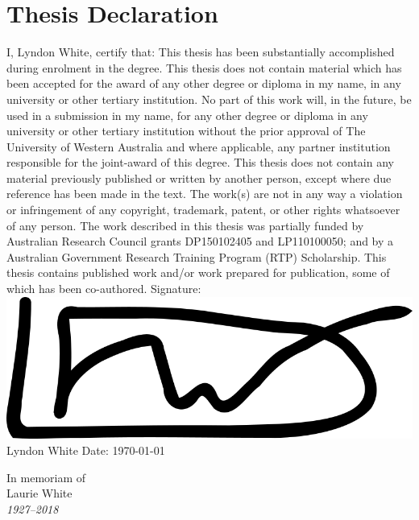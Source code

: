 \documentclass{book}
\begin{document}
\section*{Thesis Declaration}
\vskip 0.8cm
\begin{flushleft}
	I, Lyndon White, certify that:
	\vskip 0.5cm 
	This thesis has been substantially accomplished during enrolment in the degree.
	\vskip 0.25cm
	This thesis does not contain material which has been accepted for the award of any other degree or diploma in my name, in any university or other tertiary institution.
	\vskip 0.25cm
	No part of this work will, in the future, be used in a submission in my name, for any other degree or diploma in any university or other tertiary institution without the prior approval of The University of Western Australia and where applicable, any partner institution responsible for the joint-award of this degree.
	\vskip 0.25cm
	This thesis does not contain any material previously published or written by another person, except where due reference has been made in the text. 
	\vskip 0.25cm
	The work(s) are not in any way a violation or infringement of any copyright, trademark, patent, or other rights whatsoever of any person.
	\vskip 0.25cm
	The work described in this thesis was partially funded by 
	Australian Research Council grants DP150102405 and LP110100050;
	and by a Australian Government Research Training Program (RTP) Scholarship.
	\vskip 0.25cm
	This thesis contains published work and/or work prepared for publication, some of which has been co-authored. 
	\vskip 0.5cm
	Signature: 
	\includegraphics[height=2\baselineskip]{signatures/white}
	\vskip 0.25cm
	Lyndon White
	Date: \today
\end{flushleft}




{%
	\clearpage
	\thispagestyle{empty}
	\centering
	{
		In memoriam of\\
		Laurie White\\
		\emph{1927--2018}\\
	}
	\clearpage
}
\end{document}
